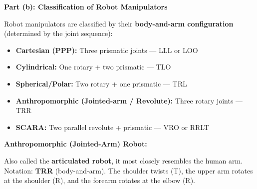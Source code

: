 \documentclass[12pt,a3paper]{article}
\begin{document}
\begin{enumerate}
\begin{tcolorbox}[enhanced,breakable,ansbox,colback=cA!4,colframe=cA,
  boxrule=0.8pt,arc=5pt,
  title={\textbf{Answer}},fonttitle=\bfseries\color{white},colbacktitle=cA]
\hrulefill

\textbf{Part (b): Classification of Robot Manipulators}

Robot manipulators are classified by their \textbf{body-and-arm configuration}
(determined by the joint sequence):

\begin{itemize}[leftmargin=1.5em,itemsep=1pt]
  \item \textbf{Cartesian (PPP):} Three prismatic joints — LLL or LOO
  \item \textbf{Cylindrical:} One rotary + two prismatic — TLO
  \item \textbf{Spherical/Polar:} Two rotary + one prismatic — TRL
  \item \textbf{Anthropomorphic (Jointed-arm / Revolute):} Three rotary
        joints — TRR
  \item \textbf{SCARA:} Two parallel revolute + prismatic — VRO or RRLT
\end{itemize}

\textbf{Anthropomorphic (Jointed-Arm) Robot:}

Also called the \textbf{articulated robot}, it most closely resembles the
human arm. Notation: \textbf{TRR} (body-and-arm). The shoulder twists (T),
the upper arm rotates at the shoulder (R), and the forearm rotates at the
elbow (R).

\begin{center}
\end{center}
\end{tcolorbox}
\end{enumerate}
\end{document}
